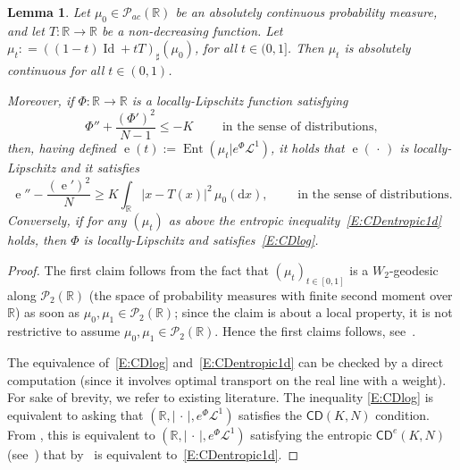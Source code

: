 \documentclass[12pt,a4paper]{amsart}
\theoremstyle{plain}
\newtheorem{lemma}{Lemma}[section]
\theoremstyle{definition}
\numberwithin{equation}{section}
\newcommand{\R}{\mathbb{R}}
\DeclareMathOperator{\Ent}{Ent}
\DeclareMathOperator{\ee}{e}
\DeclareMathOperator{\id}{Id}
\newcommand{\de}{{\mathrm{d}}}
\newcommand{\CD}{\mathsf{CD}}
\newcommand{\Prob}{\mathcal P}
\newcommand{\dotargument}{\,\cdot\,}
\renewcommand{\L}{\mathcal{L}}
\begin{document}
\begin{lemma}
  \label{lem:entropy-1d}
  Let $\mu_0\in \Prob_{ac}(\R)$ be an absolutely continuous
  probability measure, and let $T:\R\to\R$ be a non-decreasing function.
  Let $\mu_t :  =((1-t)\id+t T)_{\sharp}(\mu_0)$, 
  for all $t\in (0,1]$.
  Then $\mu_t$ is absolutely continuous for all $t\in(0,1)$.

  Moreover,
  if $\Phi:\R\to\R$ is a locally-Lipschitz function  satisfying
  \begin{equation}\label{E:CDlog}
    \Phi''
    +\frac{(\Phi')^2}{N-1}
    \leq 
    - K
    \qquad
    \text{ in the sense of distributions}
    ,
  \end{equation}
  then, having defined $\ee(t):=\Ent(\mu_t|e^{\Phi}\L^1)$, it holds
  that $\ee(\dotargument)$ is locally-Lipschitz and it satisfies
  \begin{equation}\label{E:CDentropic1d}
    \ee''
    -\frac{(\ee')^2}{N}
    \geq
    K
    \int_{\R}
    |x-T(x)|^2
    \,
    \mu_0(\de x)
    ,
    \qquad
    \text{ in the sense of distributions.}
  \end{equation}
  Conversely, if for any $(\mu_t)$ as above the entropic inequality~\eqref{E:CDentropic1d} holds, then $\Phi$ is locally-Lipschitz and satisfies~\eqref{E:CDlog}.
\end{lemma}


\begin{proof}
The first claim follows from the fact that 
$(\mu_t)_{t \in [0,1]}$ is a $W_2$-geodesic along 
$\mathcal{P}_2(\R)$ (the space of probability measures with finite second moment over $\R$) as soon as 
$\mu_0, \mu_1 \in \mathcal{P}_2(\R)$; since the claim is about a local property, it is not restrictive to 
assume $\mu_0, \mu_1 \in \mathcal{P}_2(\R)$.
Hence the first claims follows, see~\cite{villani:oldandnew}.

 The equivalence of~\eqref{E:CDlog} and~\eqref{E:CDentropic1d} can be checked by a direct computation (since it involves optimal transport on the real line with a weight). For sake of brevity, we refer to existing literature.
The inequality
\eqref{E:CDlog}
is equivalent to asking that $(\R, |\dotargument|, e^{\Phi}\mathcal{L}^1)$ satisfies the $\CD(K,N)$ condition. From 
\cite[Th.~3.12]{EKS}, this is equivalent to 
$(\R, |\dotargument|, e^{\Phi}\mathcal{L}^1)$ satisfying the 
entropic $\CD^{e}(K,N)$ (see~\cite[Definition~3.1]{EKS}) that by~\cite[Lemma~2.8,~Lemma~2.2]{EKS} is equivalent to~\eqref{E:CDentropic1d}. 
\end{proof}
\end{document}
